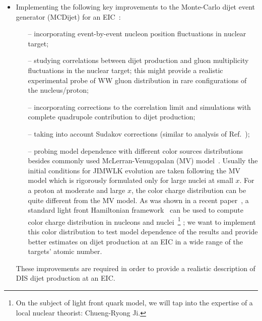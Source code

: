 \begin{itemize}
			\item 
				Implementing the following key improvements to the Monte-Carlo dijet event generator (MCDijet) 
				for an EIC~\cite{Dumitru:2018kuw}:
				\begin{itemize}
					\item[--] incorporating event-by-event nucleon position fluctuations in nuclear target; 
					\item[--] studying correlations between dijet production and gluon multiplicity fluctuations 
						in the nuclear target; this might provide a realistic experimental probe 
						of WW gluon distribution in rare configurations of the nucleus/proton;
					\item[--] incorporating corrections to the correlation limit and simulations with complete 
						quad\-rupole contribution to dijet production; 
					\item[--] taking into account Sudakov corrections (similar to analysis of Ref.~\cite{Zheng:2014vka});  
					\item[--] probing model dependence with different color sources distributions 
						besides commonly used McLerran-Venugopalan (MV) model~\cite{McLerran:1993ni}. 
						Usually the initial conditions for JIM\-WLK evolution are taken following 
						the MV model which is rigorously formulated only for large nuclei at 
						small $x$. For a proton at moderate and large $x$, the color charge 
						distribution can be quite different from the MV model. 
						As was shown in a recent paper~\cite{Dumitru:2018vpr}, a
						standard light front Hamiltonian framework~\cite{Brodsky:1997de} can be used to compute color charge 
						distribution in nucleons and nuclei~\footnote{On the subject of light front quark model, 
							we will tap into the expertise of a local nuclear theorist: Chueng-Ryong Ji.}  		
							; we want to implement this color distribution 
						to test model dependence of the results and provide better estimates on 
						dijet production at an EIC in a wide range of the targets' atomic number.    
				\end{itemize}
				These improvements are required in order to provide a realistic description of DIS
				dijet production at an EIC. 


\end{itemize}
